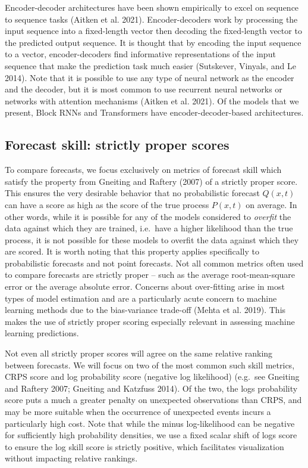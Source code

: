 \documentclass{article}
\begin{document}
Encoder-decoder architectures have been shown empirically to excel on
sequence to sequence tasks (Aitken et al. 2021). Encoder-decoders work
by processing the input sequence into a fixed-length vector then
decoding the fixed-length vector to the predicted output sequence. It is
thought that by encoding the input sequence to a vector,
encoder-decoders find informative representations of the input sequence
that make the prediction task much easier (Sutskever, Vinyals, and Le
2014). Note that it is possible to use any type of neural network as the
encoder and the decoder, but it is most common to use recurrent neural
networks or networks with attention mechanisms (Aitken et al. 2021). Of
the models that we present, Block RNNs and Transformers have
encoder-decoder-based architectures.

\hypertarget{forecast-skill-strictly-proper-scores}{%
\subsection{Forecast skill: strictly proper
scores}\label{forecast-skill-strictly-proper-scores}}

To compare forecasts, we focus exclusively on metrics of forecast skill
which satisfy the property from Gneiting and Raftery (2007) of a
strictly proper score. This ensures the very desirable behavior that no
probabilistic forecast \(Q(x,t)\) can have a score as high as the score
of the true process \(P(x,t)\) on average. In other words, while it is
possible for any of the models considered to \emph{overfit} the data
against which they are trained, i.e.~have a higher likelihood than the
true process, it is not possible for these models to overfit the data
against which they are scored. It is worth noting that this property
applies specifically to probabilistic forecasts and not point forecasts.
Not all common metrics often used to compare forecasts are strictly
proper -- such as the average root-mean-square error or the average
absolute error. Concerns about over-fitting arise in most types of model
estimation and are a particularly acute concern to machine learning
methods due to the bias-variance trade-off (Mehta et al. 2019). This
makes the use of strictly proper scoring especially relevant in
assessing machine learning predictions.

Not even all strictly proper scores will agree on the same relative
ranking between forecasts. We will focus on two of the most common such
skill metrics, CRPS score and log probability score (negative log
likelihood) (e.g.~see Gneiting and Raftery 2007; Gneiting and Katzfuss
2014). Of the two, the logs probability score puts a much a greater
penalty on unexpected observations than CRPS, and may be more suitable
when the occurrence of unexpected events incurs a particularly high
cost. Note that while the minus log-likelihood can be negative for
sufficiently high probability densities, we use a fixed scalar shift of
logs score to ensure the log skill score is strictly positive, which
facilitates visualization without impacting relative rankings.
\end{document}
